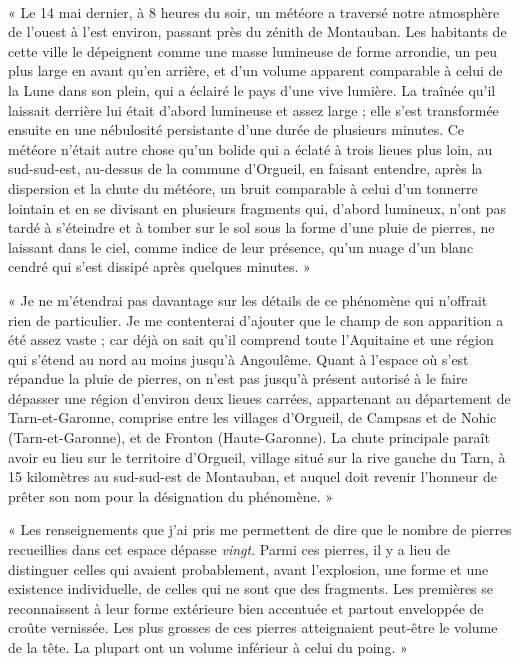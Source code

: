 \documentclass[a4paper, 11pt, oneside, polutonikogreek, french]{article}
\begin{document}
\paragraph{}
« Le 14 mai dernier, à 8 heures du soir, un météore a traversé notre atmosphère de l'ouest à l'est environ, passant près du zénith de Montauban. Les habitants de cette ville le dépeignent comme une masse lumineuse de forme arrondie, un peu plus large en avant qu'en arrière, et d'un volume apparent comparable à celui de la Lune dans son plein, qui a éclairé le pays d'une vive lumière. La traînée qu'il laissait derrière lui était d'abord lumineuse et assez large ; elle s'est transformée ensuite en une nébulosité persistante d'une durée de plusieurs minutes. Ce météore n'était autre chose qu'un bolide qui a éclaté à trois lieues plus loin, au sud-sud-est, au-dessus de la commune d'Orgueil, en faisant entendre, après la dispersion et la chute du météore, un bruit comparable à celui d'un tonnerre lointain et en se divisant en plusieurs fragments qui, d'abord lumineux, n'ont pas tardé à s'éteindre et à tomber sur le sol sous la forme d'une pluie de pierres, ne laissant dans le ciel, comme indice de leur présence, qu'un nuage d'un blanc cendré qui s'est dissipé après quelques minutes. »

« Je ne m'étendrai pas davantage sur les détails de ce phénomène qui n'offrait rien de particulier. Je me contenterai d'ajouter que le champ de son apparition a été assez vaste ; car déjà on sait qu'il comprend toute l'Aquitaine et une région qui s'étend au nord au moins jusqu'à Angoulême. Quant à l'espace où s'est répandue la pluie de pierres, on n'est pas jusqu'à présent autorisé à le faire dépasser une région d'environ deux lieues carrées, appartenant au département de Tarn-et-Garonne, comprise entre les villages d'Orgueil, de Campsas et de Nohic (Tarn-et-Garonne), et de Fronton (Haute-Garonne). La chute principale paraît avoir eu lieu sur le territoire d'Orgueil, village situé sur la rive gauche du Tarn, à 15 kilomètres au sud-sud-est de Montauban, et auquel doit revenir l'honneur de prêter son nom pour la désignation du phénomène. »

« Les renseignements que j'ai pris me permettent de dire que le nombre de pierres recueillies dans cet espace dépasse \emph{vingt}. Parmi ces pierres, il y a lieu de distinguer celles qui avaient probablement, avant l'explosion, une forme et une existence individuelle, de celles qui ne sont que des fragments. Les premières se reconnaissent à leur forme extérieure bien accentuée et partout enveloppée de croûte vernissée. Les plus grosses de ces pierres atteignaient peut-être le volume de la tête. La plupart ont un volume inférieur à celui du poing. »
\end{document}

